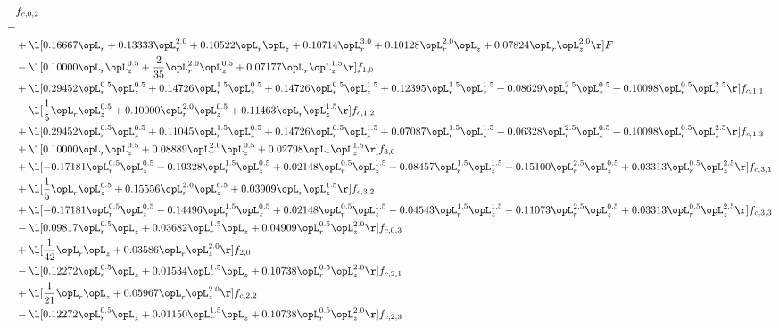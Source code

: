 \begin{alignat}{2} 
\label{eq:f_02_2} 
& f_{c,0,2} \nonumber \\ 
 = \\ 
& + \l[  0.16667 \opL_r +  0.13333 \opL_r^{2.0} +  0.10522 \opL_r \opL_z +  0.10714 \opL_r^{3.0} +  0.10128 \opL_r^{2.0} \opL_z +  0.07824 \opL_r \opL_z^{2.0}  \r] F \nonumber \\ 
& - \l[  0.10000 \opL_r \opL_z^{0.5} + \frac{2}{35} \opL_r^{2.0} \opL_z^{0.5} +  0.07177 \opL_r \opL_z^{1.5}  \r] f_{1,0} \nonumber \\ 
& + \l[  0.29452 \opL_r^{0.5} \opL_z^{0.5} +  0.14726 \opL_r^{1.5} \opL_z^{0.5} +  0.14726 \opL_r^{0.5} \opL_z^{1.5} +  0.12395 \opL_r^{1.5} \opL_z^{1.5} +  0.08629 \opL_r^{2.5} \opL_z^{0.5} +  0.10098 \opL_r^{0.5} \opL_z^{2.5}  \r] f_{c,1,1} \nonumber \\ 
& - \l[ \frac{1}{5} \opL_r \opL_z^{0.5} +  0.10000 \opL_r^{2.0} \opL_z^{0.5} +  0.11463 \opL_r \opL_z^{1.5}  \r] f_{c,1,2} \nonumber \\ 
& + \l[  0.29452 \opL_r^{0.5} \opL_z^{0.5} +  0.11045 \opL_r^{1.5} \opL_z^{0.5} +  0.14726 \opL_r^{0.5} \opL_z^{1.5} +  0.07087 \opL_r^{1.5} \opL_z^{1.5} +  0.06328 \opL_r^{2.5} \opL_z^{0.5} +  0.10098 \opL_r^{0.5} \opL_z^{2.5}  \r] f_{c,1,3} \nonumber \\ 
& + \l[  0.10000 \opL_r \opL_z^{0.5} +  0.08889 \opL_r^{2.0} \opL_z^{0.5} +  0.02798 \opL_r \opL_z^{1.5}  \r] f_{3,0} \nonumber \\ 
& + \l[  -0.17181 \opL_r^{0.5} \opL_z^{0.5}   -0.19328 \opL_r^{1.5} \opL_z^{0.5} +  0.02148 \opL_r^{0.5} \opL_z^{1.5}   -0.08457 \opL_r^{1.5} \opL_z^{1.5}   -0.15100 \opL_r^{2.5} \opL_z^{0.5} +  0.03313 \opL_r^{0.5} \opL_z^{2.5}  \r] f_{c,3,1} \nonumber \\ 
& + \l[ \frac{1}{5} \opL_r \opL_z^{0.5} +  0.15556 \opL_r^{2.0} \opL_z^{0.5} +  0.03909 \opL_r \opL_z^{1.5}  \r] f_{c,3,2} \nonumber \\ 
& + \l[  -0.17181 \opL_r^{0.5} \opL_z^{0.5}   -0.14496 \opL_r^{1.5} \opL_z^{0.5} +  0.02148 \opL_r^{0.5} \opL_z^{1.5}   -0.04543 \opL_r^{1.5} \opL_z^{1.5}   -0.11073 \opL_r^{2.5} \opL_z^{0.5} +  0.03313 \opL_r^{0.5} \opL_z^{2.5}  \r] f_{c,3,3} \nonumber \\ 
& - \l[  0.09817 \opL_r^{0.5} \opL_z +  0.03682 \opL_r^{1.5} \opL_z +  0.04909 \opL_r^{0.5} \opL_z^{2.0}  \r] f_{c,0,3} \nonumber \\ 
& + \l[ \frac{1}{42} \opL_r \opL_z +  0.03586 \opL_r \opL_z^{2.0}  \r] f_{2,0} \nonumber \\ 
& - \l[  0.12272 \opL_r^{0.5} \opL_z +  0.01534 \opL_r^{1.5} \opL_z +  0.10738 \opL_r^{0.5} \opL_z^{2.0}  \r] f_{c,2,1} \nonumber \\ 
& + \l[ \frac{1}{21} \opL_r \opL_z +  0.05967 \opL_r \opL_z^{2.0}  \r] f_{c,2,2} \nonumber \\ 
& - \l[  0.12272 \opL_r^{0.5} \opL_z +  0.01150 \opL_r^{1.5} \opL_z +  0.10738 \opL_r^{0.5} \opL_z^{2.0}  \r] f_{c,2,3} \nonumber \\ 
\end{alignat} 


